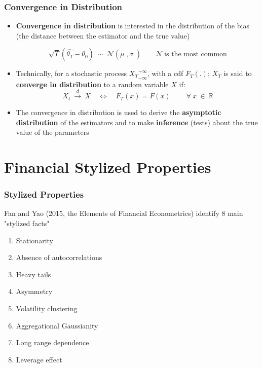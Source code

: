 \documentclass{beamer}
\begin{document}
  \begin{frame}
    \frametitle{Convergence in Distribution}

    \begin{itemize}
\item  \textbf{Convergence in distribution} is interested in the distribution of the bias (the distance between the estimator and the true value)

  \begin{equation*}
    \sqrt{T} \left(\hat{\theta_T} - \theta_0 \right) \ \sim \ \mathcal{N}(\mu_., \sigma_.) \qquad \mathcal{N} \ \text{is the most common} 
  \end{equation*}

\item Technically, for a stochastic process ${X_T}_{-\infty}^ {+\infty}$, with a cdf $F_T(.)$; $X_T$ is said to \textbf{converge in distribution} to a random variable $X$ if:
  \begin{equation*}
X_t \ \overset{d}{\to} \ X \quad \Leftrightarrow \quad  F_T(x) = F(x) \qquad \ \forall \ x \ \in \ \mathbb{R}
  \end{equation*}
    
\item The convergence in distribution is used to derive the \textbf{asymptotic distribution} of the estimators and to make \textbf{inference} (tests) about the true value of the parameters

    \end{itemize}
    
  \end{frame}



\section{Financial Stylized Properties}

\begin{frame}
  \frametitle{Stylized Properties}

  Fan and Yao (2015, the Elements of Financial Econometrics) identify 8 main "stylized facts"
  
  \begin{enumerate}
  \item Stationarity
  \item Absence of autocorrelations
  \item Heavy tails
  \item Asymmetry
  \item Volatility clustering
  \item Aggregational Gaussianity
  \item Long range dependence
  \item Leverage effect
  \end{enumerate}
  
\end{frame}
\end{document}
